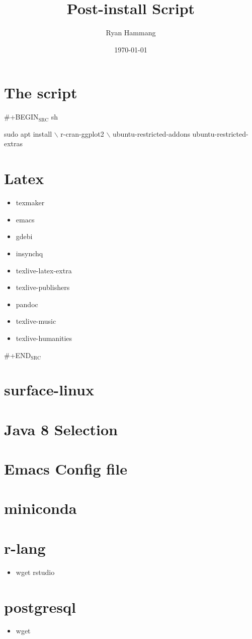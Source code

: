 \documentclass[11pt]{article}
\author{Ryan Hammang}
\date{\today}
\title{Post-install Script}
\begin{document}
\maketitle
\tableofcontents


\section{The script}
\label{sec:orgbe82fe9}
\#+BEGIN\(_{\text{SRC}}\) sh

sudo apt install $\backslash$
r-cran-ggplot2 $\backslash$
ubuntu-restricted-addons
ubuntu-restricted-extras

\section{Latex}
\label{sec:org2c93cec}
\begin{itemize}
\item texmaker
\item emacs
\item gdebi
\item insynchq
\item texlive-latex-extra
\item texlive-publishers
\item pandoc
\item texlive-music
\item texlive-humanities
\end{itemize}


\#+END\(_{\text{SRC}}\)

\section{surface-linux}
\label{sec:orgf8958ca}

\section{Java 8 Selection}
\label{sec:org870cf32}
\section{Emacs Config file}
\label{sec:org4e86b83}
\section{miniconda}
\label{sec:org76add3f}
\section{r-lang}
\label{sec:orgcc4ff74}
\begin{itemize}
\item wget rstudio
\end{itemize}
\section{postgresql}
\label{sec:org280fd24}
\begin{itemize}
\item wget
\end{itemize}
\end{document}
